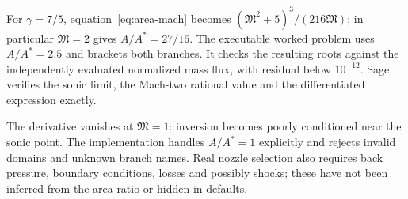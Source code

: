 For $\gamma=7/5$, equation~\eqref{eq:area-mach} becomes
$(\mathfrak M^2+5)^3/(216\mathfrak M)$; in particular $\mathfrak M=2$ gives $A/A^*=27/16$.
The executable worked problem uses $A/A^*=2.5$ and brackets both branches.
It checks the resulting roots against the independently evaluated normalized
mass flux, with residual below $10^{-12}$. Sage verifies the sonic limit,
the Mach-two rational value and the differentiated expression exactly.

The derivative vanishes at $\mathfrak M=1$: inversion becomes poorly conditioned near
the sonic point. The implementation handles $A/A^*=1$ explicitly and rejects
invalid domains and unknown branch names. Real nozzle selection also requires
back pressure, boundary conditions, losses and possibly shocks; these have not
been inferred from the area ratio or hidden in defaults.
